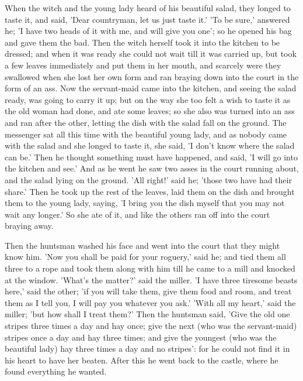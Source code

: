 \documentclass[12pt]{book}
\begin{document}
When the witch and the young lady heard of his beautiful salad, they
longed to taste it, and said, 'Dear countryman, let us just taste it.'
'To be sure,' answered he; 'I have two heads of it with me, and will
give you one'; so he opened his bag and gave them the bad. Then the
witch herself took it into the kitchen to be dressed; and when it was
ready she could not wait till it was carried up, but took a few leaves
immediately and put them in her mouth, and scarcely were they
swallowed when she lost her own form and ran braying down into the
court in the form of an ass. Now the servant-maid came into the
kitchen, and seeing the salad ready, was going to carry it up; but on
the way she too felt a wish to taste it as the old woman had done, and
ate some leaves; so she also was turned into an ass and ran after the
other, letting the dish with the salad fall on the ground. The
messenger sat all this time with the beautiful young lady, and as
nobody came with the salad and she longed to taste it, she said, 'I
don't know where the salad can be.' Then he thought something must
have happened, and said, 'I will go into the kitchen and see.' And as
he went he saw two asses in the court running about, and the salad
lying on the ground. 'All right!' said he; 'those two have had their
share.' Then he took up the rest of the leaves, laid them on the dish
and brought them to the young lady, saying, 'I bring you the dish
myself that you may not wait any longer.' So she ate of it, and like
the others ran off into the court braying away.

Then the huntsman washed his face and went into the court that they
might know him. 'Now you shall be paid for your roguery,' said he; and
tied them all three to a rope and took them along with him till he
came to a mill and knocked at the window. 'What's the matter?' said
the miller. 'I have three tiresome beasts here,' said the other; 'if
you will take them, give them food and room, and treat them as I tell
you, I will pay you whatever you ask.' 'With all my heart,' said the
miller; 'but how shall I treat them?' Then the huntsman said, 'Give
the old one stripes three times a day and hay once; give the next (who
was the servant-maid) stripes once a day and hay three times; and give
the youngest (who was the beautiful lady) hay three times a day and no
stripes': for he could not find it in his heart to have her beaten.
After this he went back to the castle, where he found everything he
wanted.
\end{document}
